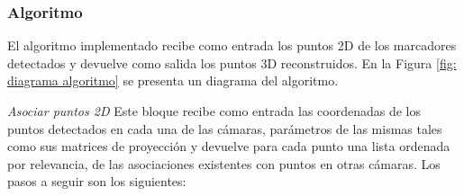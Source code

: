 \subsubsection{Algoritmo}
El algoritmo implementado recibe como entrada los puntos 2D de los marcadores detectados y devuelve como salida los puntos 3D reconstruidos. 
En la Figura \ref{fig: diagrama algoritmo} se presenta un diagrama del algoritmo.

\textit{Asociar puntos 2D}\label{seccion_asociar2D_uno}
%
Este bloque recibe como entrada las coordenadas de los puntos detectados en cada una de las cámaras, parámetros de las mismas tales como sus matrices de proyección y devuelve para cada punto una lista ordenada por relevancia, de las asociaciones existentes con puntos en otras cámaras. Los pasos a seguir son los siguientes:

